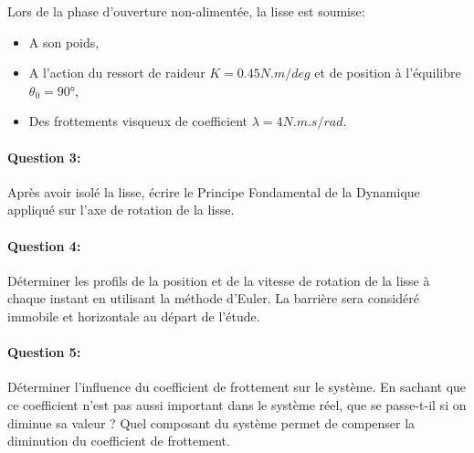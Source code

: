 Lors de la phase d'ouverture non-alimentée, la lisse est soumise:
\begin{itemize}
 \item A son poids,
 \item A l'action du ressort de raideur $K=0.45N.m/deg$ et de position à l'équilibre $\theta_0=90°$,
 \item Des frottements visqueux de coefficient $\lambda=4N.m.s/rad$.
\end{itemize}

\paragraph{Question 3:} Après avoir isolé la lisse, écrire le Principe Fondamental de la Dynamique appliqué sur l'axe de rotation de la lisse. 

\paragraph{Question 4:} Déterminer les profils de la position et de la vitesse de rotation de la lisse à chaque instant en utilisant la méthode d'Euler. La barrière sera considéré immobile et horizontale au départ de l'étude.

\paragraph{Question 5:} Déterminer l'influence du coefficient de frottement sur le système. En sachant que ce coefficient n'est pas aussi important dans le système réel, que se passe-t-il si on diminue sa valeur ? Quel composant du système permet de compenser la diminution du coefficient de frottement.

